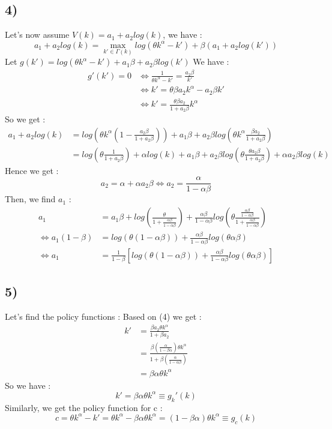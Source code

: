 \documentclass{article}
\begin{document}
\subsection{4)}
Let's now assume $V(k) = a_1+a_2log(k)$, we have : $$a_1+a_2log(k) = \max_{k'\in\Gamma(k)}log(\theta k^\alpha-k')+\beta (a_1+a_2log(k')) $$
Let $g(k') = log(\theta k^\alpha-k') + a_1\beta +a_2\beta log(k')$
We have : $$\begin{aligned}g'(k') = 0 &\Longleftrightarrow \frac{1}{\theta k^\alpha -k'}= \frac{a_2\beta}{k'}\\
&\Longleftrightarrow k'=\theta\beta a_2 k^\alpha-a_2\beta k'\\
&\Longleftrightarrow k' = \frac{\theta \beta a_2}{1+a_2\beta}k^\alpha
\end{aligned}$$
So we get : 
$$\begin{aligned}
    a_1+a_2log(k) &= log(\theta k^\alpha(1-\frac{a_2\beta}{1+a_2\beta})) + a_1\beta + a_2\beta log(\theta k^\alpha\frac{\beta a_2}{1+a_2\beta}) \\
    &= log(\theta\frac{1}{1+a_2\beta}) + \alpha log(k) + a_1\beta + a_2 \beta log(\theta \frac{\theta a_2\beta}{1+a_2\beta })+\alpha a_2\beta log(k)
\end{aligned}$$
Hence we get : 
$$a_2 = \alpha +\alpha a_2\beta \Longleftrightarrow a_2 = \frac{\alpha}{1-\alpha\beta}$$
Then, we find $a_1$ : 
$$\begin{aligned}
    a_1 &= a_1\beta +log(\frac{\theta }{1+\frac{\alpha \beta}{1-\alpha\beta}})+\frac{\alpha\beta}{1-\alpha\beta}log(\theta \frac{\frac{\alpha\beta}{1-\alpha\beta}}{1+\frac{\alpha\beta}{1-\alpha\beta}})\\
    \Longleftrightarrow a_1(1-\beta) &= log(\theta(1-\alpha\beta)) + \frac{\alpha\beta}{1-\alpha\beta}log(\theta\alpha\beta)\\
    \Longleftrightarrow a_1 &= \frac{1}{1-\beta}[log(\theta (1-\alpha\beta))+\frac{\alpha\beta}{1-\alpha\beta}log(\theta\alpha\beta)]
\end{aligned}$$
\subsection{5)}
Let's find the policy functions : Based on (4) we get : 
$$\begin{aligned}k' &= \frac{\beta a_2\theta k^\alpha }{1+\beta a_2}\\
&= \frac{\beta (\frac{\alpha}{1-\beta\alpha})\theta k^\alpha}{1+\beta(\frac{\alpha}{1-\alpha\beta})}\\
&= \beta\alpha\theta k^\alpha 
\end{aligned}$$
So we have : $$k' = \beta \alpha\theta k^\alpha \equiv g_k'(k)$$
Similarly, we get the policy function for c : 
$$c = \theta k^\alpha -k' = \theta k^\alpha - \beta\alpha\theta k^\alpha = (1-\beta\alpha)\theta k^\alpha \equiv g_c(k)$$
\end{document}
